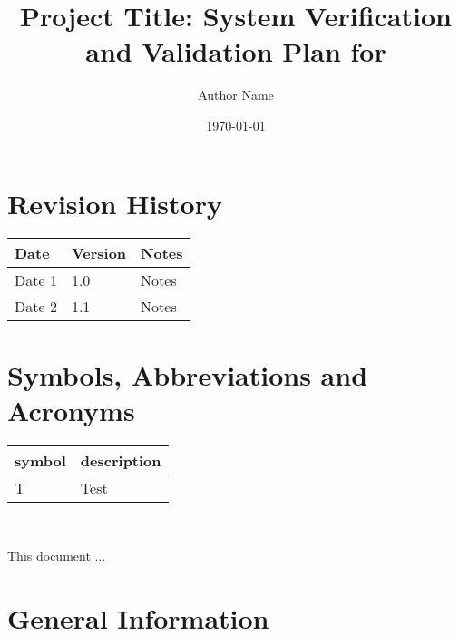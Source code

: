 \documentclass[12pt, titlepage]{article}
\begin{document}
\title{Project Title: System Verification and Validation Plan for \progname{}} 
\author{Author Name}
\date{\today}
	
\maketitle


\section{Revision History}

\begin{tabularx}{\textwidth}{p{3cm}p{2cm}X}
\toprule {\bf Date} & {\bf Version} & {\bf Notes}\\
\midrule
Date 1 & 1.0 & Notes\\
Date 2 & 1.1 & Notes\\
\bottomrule
\end{tabularx}

\newpage

\tableofcontents

\listoftables
{}

\listoffigures
{}

\newpage

\section{Symbols, Abbreviations and Acronyms}

\renewcommand{\arraystretch}{1.2}
\begin{tabular}{l l} 
  \toprule		
  \textbf{symbol} & \textbf{description}\\
  \midrule 
  T & Test\\
  \bottomrule
\end{tabular}\\


\newpage


This document ... 

\section{General Information}
\end{document}
